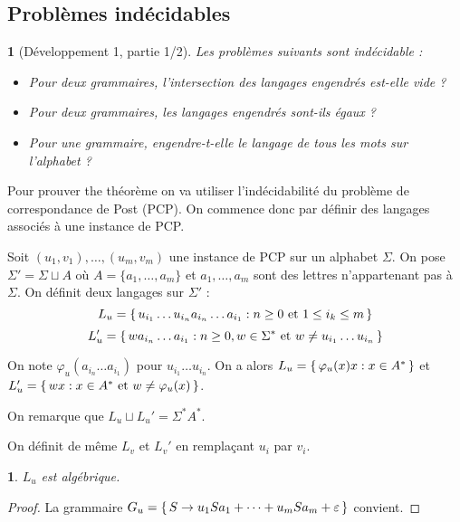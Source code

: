 \documentclass[10pt,a4paper,notitlepage]{article}
\theoremstyle{plain}
\theoremstyle{definition}
\theoremstyle{definition}
\theoremstyle{remark}
\theoremstyle{remark}
\theoremstyle{plain}
\newtheorem{lem}[thm]{\protect\lemmaname}
\theoremstyle{plain}
\newtheorem{prop}[thm]{\protect\propositionname}
\theoremstyle{plain}
\theoremstyle{remark}
\providecommand{\lemmaname}{Lemme}
\providecommand{\propositionname}{Proposition}
\begin{document}


\subsection{Problèmes indécidables}
\begin{prop}[Développement 1, partie 1/2]\label{thindec}
	Les problèmes suivants sont indécidable : %
	\begin{itemize}
		\item[1.] Pour deux grammaires, l'intersection des langages engendrés est-elle vide ?
		\item[2.] Pour deux grammaires, les langages engendrés sont-ils égaux ?
		\item[3.] Pour une grammaire, engendre-t-elle le langage de tous les mots sur l'alphabet ?
	\end{itemize}
\end{prop}

Pour prouver the théorème on va utiliser l'indécidabilité du  problème de correspondance de Post (PCP). On commence donc par définir des langages associés à une instance de PCP.

Soit $(u_1,v_1),\dots,(u_m,v_m)$ une instance de PCP sur un alphabet $\Sigma$. On pose $\Sigma' = \Sigma \sqcup A$ où $A=\{a_1,\dots, a_m\}$ et $a_1,\dots,a_m$ sont des lettres n'appartenant pas à $\Sigma$. On définit deux langages sur $\Sigma'$ :
$$L_u=\set{u_{i_1}\dots u_{i_n}a_{i_n}\dots a_{i_1} : n\ge 0\text{ et }1\le i_k \le m}$$
$$L_u'=\set{wa_{i_n}\dots a_{i_1} : n\ge 0, w\in\Sigma^*\text{ et }w\not=u_{i_1}\dots u_{i_n}}$$

On note $\varphi_u(a_{i_n}\dots a_{i_1})$ pour $u_{i_1}\dots u_{i_n}$. On a alors $L_u=\set{\varphi_u(x)x : x \in A^*}$ et $L_u'=\set{wx : x \in A^*\text{ et } w\not=\varphi_u(x)}$.

On remarque que $L_u \sqcup L_u' = \Sigma^*A^*$.

On définit de même $L_v$ et $L_v'$ en remplaçant $u_i$ par $v_i$.

\begin{lem}
	$L_u$ est algébrique.
\end{lem}

\begin{proof}
	La grammaire $G_u = \set{S\to u_1Sa_1+\dots+ u_mSa_m+\varepsilon}$ convient.
\end{proof}
\end{document}

